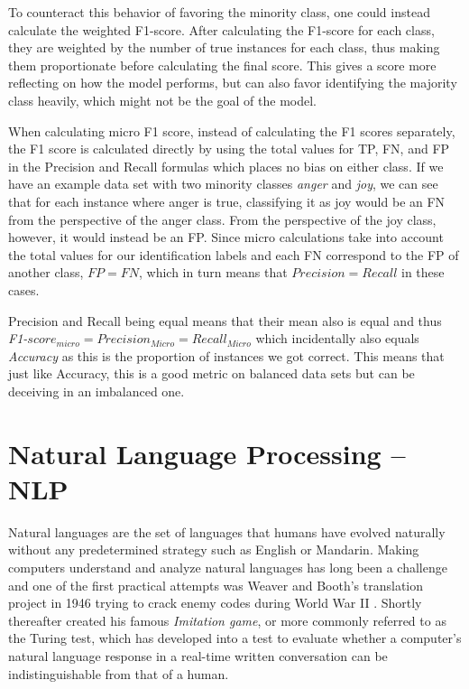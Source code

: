 \documentclass[nofilelist]{cslthse-msc}
\begin{document}
To counteract this behavior of favoring the minority class, one could instead calculate the weighted F1-score. After calculating the F1-score for each class, they are weighted by the number of true instances for each class, thus making them proportionate before calculating the final score. This gives a score more reflecting on how the model performs, but can also favor identifying the majority class heavily, which might not be the goal of the model.

When calculating micro F1 score, instead of calculating the F1 scores separately, the F1 score is calculated directly by using the total values for TP, FN, and FP in the Precision and Recall formulas which places no bias on either class. If we have an example data set with two minority classes \textit{anger} and \textit{joy}, we can see that for each instance where anger is true, classifying it as joy would be an FN from the perspective of the anger class. From the perspective of the joy class, however, it would instead be an FP. Since micro calculations take into account the total values for our identification labels and each FN correspond to the FP of another class, $FP = FN$, which in turn means that $Precision = Recall$ in these cases. 

Precision and Recall being equal means that their mean also is equal and thus \textit{F1-}$score_{micro} = Precision_{Micro} = Recall_{Micro}$ which incidentally also equals \textit{Accuracy} as this is the proportion of instances we got correct. This means that just like Accuracy, this is a good metric on balanced data sets but can be deceiving in an imbalanced one.



\section{Natural Language Processing -- NLP}
Natural languages are the set of languages that humans have evolved naturally without any predetermined strategy such as English or Mandarin. Making computers understand and analyze natural languages has long been a challenge and one of the first practical attempts was Weaver and Booth's translation project in 1946 trying to crack enemy codes during World War II \citep{Liddy2001NLP}. Shortly thereafter \citet{Turing1950} created his famous \textit{Imitation game}, or more commonly referred to as the Turing test, which has developed into a test to evaluate whether a computer's natural language response in a real-time written conversation can be indistinguishable from that of a human. 
\end{document}
